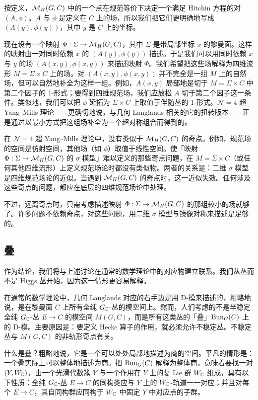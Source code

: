按定义，$\mathcal{M}_{H}(G,C)$ 中的一个点在规范等价下决定一个满足 Hitchin 方程的对 $(A,\phi)$。$A$ 与 $\phi$ 是定义在 $C$ 上的场，所以我们把它们更明确地写成 $(A(y),\phi(y))$，其中 $y$ 是 $C$ 上的坐标。

现在设有一个映射 $\Phi:\Sigma\to\mathcal{M}_{H}(G,C)$，其中 $\Sigma$ 是带局部坐标 $x$ 的黎曼面。这样的映射由一对同时依赖 $x$ 的 $(A(y),\phi(y))$ 描述。于是我们可以用同时依赖 $x$ 与 $y$ 的场 $(A(x,y),\phi(x,y))$ 来描述映射 $\Phi$。我们希望把这些场解释为四维流形 $M=\Sigma\times C$ 上的场。对 $(A(x,y),\phi(x,y))$ 并不完全是一组 $M$ 上的自然场，但可以自然地补全为这样一组。例如，$A(x,y)$ 局部地是切于 $M=\Sigma\times C$ 中第二个因子的 1-形式；要得到四维规范场，我们应放松 $A$ 切于第二个因子这一条件。类似地，我们可以把 $\phi$ 延拓为 $\Sigma\times C$ 上取值于伴随丛的 1-形式。$\mathcal{N}=4$ 超 Yang--Mills 理论——更确切地说，与几何 Langlands 相关的它的扭转版本——正是通过以最小方式把这组场补全为一个超对称组合而得到的。

在 $\mathcal{N}=4$ 超 Yang--Mills 理论中，没有类似于 $\mathcal{M}_{H}(G,C)$ 的奇点。例如，规范场的空间是仿射空间，其他场（如 $\phi$）取值于线性空间。使「映射 $\Phi:\Sigma\to\mathcal{M}_{H}(G,C)$ 的 $\sigma$ 模型」难以定义的那些奇点问题，在 $M=\Sigma\times C$（或任何其他四维流形）上定义规范场论时都没有类似物。两者的关系是：二维 $\sigma$ 模型是四维规范场论的近似。当遇到 $\mathcal{M}_{H}(G,C)$ 的奇点时，这一近似失效。任何涉及这些奇点的问题，都应在底层的四维规范场论中处理。

不过，远离奇点时，只需考虑描述映射 $\Phi:\Sigma\to\mathcal{M}_{H}(G,C)$ 的那组较小的场就够了。许多问题不依赖奇点，对这些问題，用二维 $\sigma$ 模型与镜像对称来描述是足够的。

\subsection{叠}

作为结论，我们将与上述讨论在通常的数学理论中的对应物建立联系。我们从丛而不是 Higgs 丛开始，因为这一情形更容易解释。

在通常的数学理论中，几何 Langlands 对应的右手边是用 D-模来描述的，粗略地说，是在黎曼面 $C$ 上所有全纯 $G_{\mathbb{C}}$-丛的模空间上。然而，人们考虑的不是半稳定全纯 $G_{\mathbb{C}}$-丛 $E\to C$ 的模空间 $M(G,C)$，而是所有这类丛的「叠」$\mathrm{Bun}_{G}(C)$ 上的 D-模。主要原因是：要定义 Hecke 算子的作用，就必须允许不稳定丛。不稳定丛与 $M(G,C)$ 的非轨形奇点有关。

什么是叠？粗略地说，它是一个可以处处局部地描述为商的空间。平凡的情形是：一个叠实际上可以整体地描述为商。把 $\mathrm{Bun}_{G}(C)$ 解释为整体商，意味着要找一对 $(Y,W_{\mathbb{C}})$，由一个光滑代数簇 $Y$ 与一个作用在 $Y$ 上的复 Lie 群 $W_{\mathbb{C}}$ 组成，具有以下性质：全纯 $G_{\mathbb{C}}$-丛 $E\to C$ 的同构类应与 $Y$ 上的 $W_{\mathbb{C}}$-轨道一一对应；并且对每个 $E\to C$，其自同构群应同构于 $W_{\mathbb{C}}$ 中固定 $Y$ 中对应点的子群。

